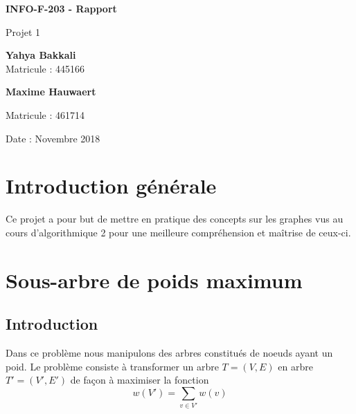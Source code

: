 \documentclass{article}
\begin{document}
\begin{titlepage}
    \begin{center}
        \vspace*{1cm}
        
        \Huge
        \textbf{INFO-F-203 - Rapport}
        
        \vspace{0.5cm}
        \LARGE
        Projet 1
        
        \vspace{1.5cm}
        
        \textbf{Yahya Bakkali\\}
        \Large
        Matricule : 445166\\
        
		\vspace{0.5cm}        
        
        \LARGE
        \textbf{Maxime Hauwaert\\}
        
		\Large        
        Matricule : 461714\\
        
        \vspace{0.8cm}

        Date : Novembre 2018
        
    \end{center}
\end{titlepage}

\setcounter{tocdepth}{3}
\tableofcontents
\newpage
\Large
	
\section{Introduction générale}
Ce projet a pour but de mettre en pratique des concepts sur les graphes vus au cours d’algorithmique 2 pour une meilleure compréhension et maîtrise de ceux-ci.

\section{Sous-arbre de poids maximum}
	\subsection{Introduction}
		Dans ce problème nous manipulons des arbres constitués de noeuds ayant un poid. Le problème consiste à transformer un arbre $T=(V,E)$ en arbre ${T'}=({V'},{E'})$ de façon à maximiser la fonction
		$$w({V'})=\sum_{v\in{V'}} w(v)$$
\end{document}
